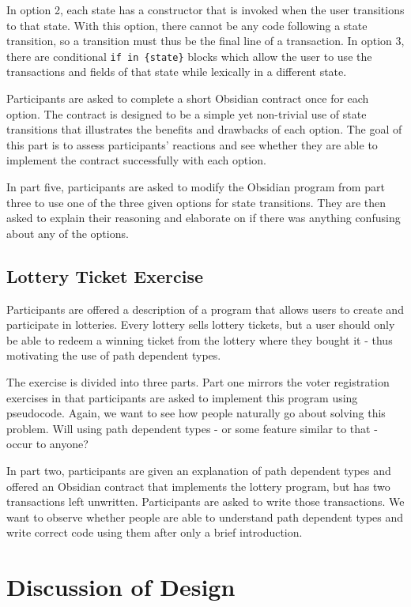 \documentclass[sigplan,10pt,review]{acmart}\settopmatter{printfolios=true}
\begin{document}
In option 2, each state has a constructor that is invoked when the user transitions to that state. With this
option, there cannot be any code following a state transition, so a transition must thus be the final line of a 
transaction. In option 3, there are conditional \texttt{\small{if in \{state\}}} blocks which allow the user
to use the transactions and fields of that state while lexically in a different state. 

Participants are asked to complete a short Obsidian contract once for each option. The contract is 
designed to be a simple yet non-trivial use of state transitions that illustrates the benefits and drawbacks of each 
option. The goal of this part is to assess participants' reactions and see whether they are able to implement the 
contract successfully with each option.

In part five, participants are asked to modify the Obsidian program from part three to use one of the three given 
options for state transitions. They are then asked to explain their reasoning and elaborate on if there was 
anything confusing about any of the options. 

\subsection{Lottery Ticket Exercise}
	
Participants are offered a description of a program that allows users to create and participate in lotteries. Every 
lottery sells lottery tickets, but a user should only be able to redeem a winning ticket from the lottery where they 
bought it - thus motivating the use of path dependent types. 

The exercise is divided into three parts. Part one mirrors the voter registration exercises in that participants are 
asked to implement this program using pseudocode. Again, we want to see how people naturally go about 
solving this problem. Will using path dependent types - or some feature similar to that - occur to anyone?
	
In part two, participants are given an explanation of path dependent types and offered an Obsidian contract that 
implements the lottery program, but has two transactions left unwritten. Participants are asked to write 
those transactions. We want to observe whether people are able to understand path dependent types and write 
correct code using them after only a brief introduction. 

\section{Discussion of Design}
\end{document}
